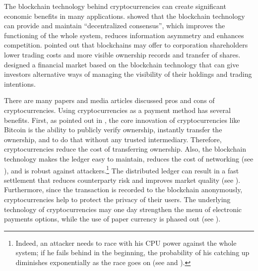 \documentclass[draft, noinfoline]{ectaart}
\numberwithin{equation}{section}
\theoremstyle{plain}
\begin{document}
The blockchain technology behind cryptocurrencies can create significant economic benefits in many applications.  \cite{cong_blockchain_nodate} showed that the blockchain technology can provide and maintain ``decentralized consensus'', which improves the functioning of the whole system, reduces information asymmetry and enhances competition. \cite{yermack_corporate_2017} pointed out that blockchains may offer to corporation shareholders lower trading costs and more visible ownership records and transfer of shares. \cite{malinova_market_2017} designed a financial market based on the blockchain technology that can give investors alternative ways of managing the visibility of their holdings and trading intentions.



There are many papers and media articles discussed pros and cons of cryptocurrencies.
Using cryptocurrencies as a payment method has several benefits. First, as pointed out in \cite{harvey_cryptofinance_2016}, the core innovation of cryptocurrencies like Bitcoin is the ability to publicly verify ownership, instantly transfer the ownership, and to do that without any trusted intermediary. Therefore, cryptocurrencies reduce the cost of transferring ownership. Also, the blockchain technology makes the ledger easy to maintain, reduces the cost of networking (see \cite{catalini_simple_2016}), and is robust against attackers.\footnote{Indeed, an attacker needs to race with his CPU power against the whole system; if he fails behind in the beginning, the probability of his catching up diminishes exponentially as the race goes on (see \cite{nakamoto_bitcoin:_2008} and  \cite{Grunspan_2018}).} The distributed ledger can result in a fast settlement that reduces counterparty risk and improves market quality (see \cite{khapko_smart_2018}). Furthermore, since the transaction is recorded to the blockchain anonymously, cryptocurrencies help to protect the privacy of their users. The underlying technology of cryptocurrencies may one day strengthen the menu of electronic payments options, while the use of paper currency is phased out (see \cite{rogoff_costs_2015}).
\end{document}
